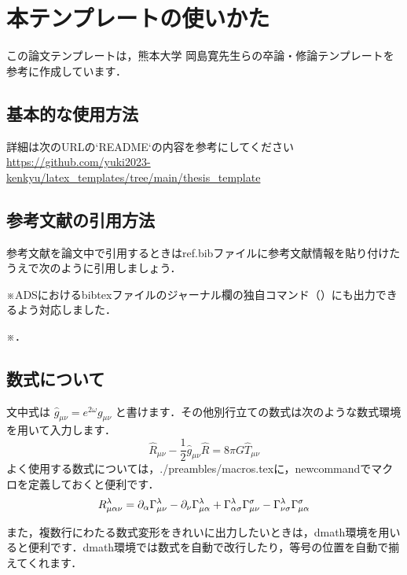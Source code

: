 \chapter{本テンプレートの使いかた}
この論文テンプレートは，熊本大学 岡島寛先生らの卒論・修論テンプレートを参考に作成しています\cite{卒論修論テンプレート}．
    \section{基本的な使用方法}
    詳細は次のURLの`README`の内容を参考にしてください\url{https://github.com/yuki2023-kenkyu/latex_templates/tree/main/thesis_template}
	\section{参考文献の引用方法}
	参考文献を論文中で引用するときはref.bibファイルに参考文献情報を貼り付けたうえで次のように引用しましょう\cite{G_ng_r_2021}．

    ※ADSにおけるbibtexファイルのジャーナル欄の独自コマンド（\apj）にも出力できるよう対応しました\cite{2023ApJ...944..124T}．

    ※\cite{小形正男2024-09-21,梶野洸2024-01-19,前田恵一2024-10-23,Planck:2018vyg}．
	\section{数式について}
	文中式は $\hat{g}_{\mu\nu}=e^{2\omega}g_{\mu\nu}$ と書けます．その他別行立ての数式は次のような数式環境を用いて入力します．
        \begin{equation}
            \hat{R}_{\mu\nu} - \frac{1}{2}\hat{g}_{\mu\nu}\hat{R} = 8\pi G\hat{T}_{\mu\nu}\label{eq:Einstein_eq}
        \end{equation}
	よく使用する数式については，./preambles/macros.texに，newcommandでマクロを定義しておくと便利です．
		\begin{equation}
			R_{\mu\alpha\nu}^{\lambda}=\partial_{\alpha}\Gamma^{\lambda}_{\mu \nu} - \partial_{\nu}\Gamma^{\lambda}_{\mu \alpha} + \Gamma^{\lambda}_{\alpha \sigma}\Gamma^{\sigma}_{\mu \nu} - \Gamma^{\lambda}_{\nu \sigma}\Gamma^{\sigma}_{\mu \alpha}\label{eq:Riemann_tensor}
		\end{equation}

	また，複数行にわたる数式変形をきれいに出力したいときは，dmath環境を用いると便利です．dmath環境では数式を自動で改行したり，等号の位置を自動で揃えてくれます．

